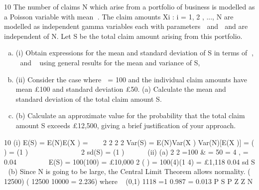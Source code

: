 \documentclass[a4paper,12pt]{article}
\begin{document}
  10 The number of claims N which arise from a portfolio of business is modelled as a
Poisson variable with mean . The claim amounts Xi : i = 1, 2 , ..., N are modelled as
independent gamma variables each with parameters  and  and are independent of
N. Let S be the total claim amount arising from this portfolio.
\begin{enumerate}[(a)]

\item (i) Obtain expressions for the mean and standard deviation of S in terms of , 
and using general results for the mean and variance of S, 
\item (ii) Consider the case where  = 100 and the individual claim amounts have mean
£100 and standard deviation £50.
(a) Calculate the mean and standard deviation of the total claim amount S.
\item (b) Calculate an approximate value for the probability that the total claim
amount S exceeds £12,500, giving a brief justification of your
approach. 
\end{enumerate}
10 (i) E(S) = E(N)E(X ) = 


2 2
2 2 Var(S) = E(N)Var(X ) Var(N)[E(X )] = ( ) = (1 )   
    
  
2
sd(S) = (1 )  


(ii) (a) 2
2 =100 & = 50 = 4 , = 0.04  
  
 
E(S) = 100(100) = £10,000
2
( ) = 100(4)(1 4) = £1,118
0.04
sd S 
(b) Since N is going to be large, the Central Limit Theorem allows
normality.
( 12500) ( 12500 10000 = 2.236) where ~ (0,1)
1118
=1 0.987 = 0.013
P S P Z Z N 
  

\end{document}
